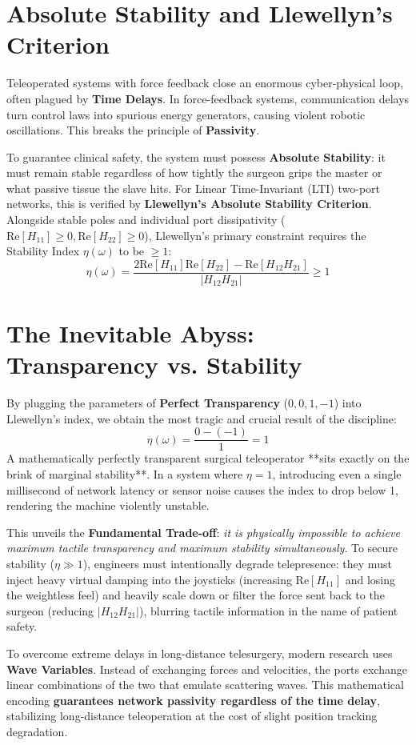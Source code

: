 \documentclass[11pt,a4paper,twoside]{report}
\begin{document}
\section{Absolute Stability and Llewellyn's Criterion}
Teleoperated systems with force feedback close an enormous cyber-physical loop, often plagued by \textbf{Time Delays}. In force-feedback systems, communication delays turn control laws into spurious energy generators, causing violent robotic oscillations. This breaks the principle of \textbf{Passivity}.

To guarantee clinical safety, the system must possess \textbf{Absolute Stability}: it must remain stable regardless of how tightly the surgeon grips the master or what passive tissue the slave hits. For Linear Time-Invariant (LTI) two-port networks, this is verified by \textbf{Llewellyn's Absolute Stability Criterion}.
Alongside stable poles and individual port dissipativity ($\text{Re}[H_{11}]\ge 0, \text{Re}[H_{22}]\ge 0$), Llewellyn's primary constraint requires the Stability Index $\eta(\omega)$ to be $\ge 1$:
\begin{equation}
    \eta(\omega) = \frac{2 \text{Re}[H_{11}] \text{Re}[H_{22}] - \text{Re}[H_{12}H_{21}]}{|H_{12}H_{21}|} \ge 1
\end{equation}

\section{The Inevitable Abyss: Transparency vs. Stability}
By plugging the parameters of \textbf{Perfect Transparency} ($0, 0, 1, -1$) into Llewellyn's index, we obtain the most tragic and crucial result of the discipline:
\begin{equation}
    \eta(\omega) = \frac{0 - (-1)}{1} = 1
\end{equation}
A mathematically perfectly transparent surgical teleoperator **sits exactly on the brink of marginal stability**. 
In a system where $\eta = 1$, introducing even a single millisecond of network latency or sensor noise causes the index to drop below 1, rendering the machine violently unstable.

This unveils the \textbf{Fundamental Trade-off}: \textit{it is physically impossible to achieve maximum tactile transparency and maximum stability simultaneously}. To secure stability ($\eta \gg 1$), engineers must intentionally degrade telepresence: they must inject heavy virtual damping into the joysticks (increasing $\text{Re}[H_{11}]$ and losing the weightless feel) and heavily scale down or filter the force sent back to the surgeon (reducing $|H_{12}H_{21}|$), blurring tactile information in the name of patient safety.

To overcome extreme delays in long-distance telesurgery, modern research uses \textbf{Wave Variables}. Instead of exchanging forces and velocities, the ports exchange linear combinations of the two that emulate scattering waves. This mathematical encoding \textbf{guarantees network passivity regardless of the time delay}, stabilizing long-distance teleoperation at the cost of slight position tracking degradation.
\end{document}
